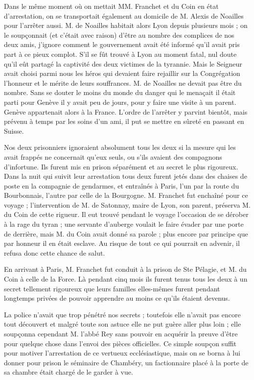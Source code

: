 Dans le même moment où on mettait MM. Franchet et du Coin en état d'arrestation, on se transportait également au domicile de M. Alexis de Noailles pour l'arrêter aussi. M. de Noailles habitait alors Lyon depuis plusieurs mois ; on le soupçonnait (et c'était avec raison) d'être au nombre des complices de nos deux amis, j'ignore comment le gouvernement avait été informé qu'il avait pris part à ce pieux complot. S'il se fût trouvé à Lyon au moment fatal, nul doute qu'il eût partagé la captivité des deux victimes de la tyrannie. Mais le Seigneur avait choisi parmi nous les héros qui devaient faire rejaillir sur la Congrégation l'honneur et le mérite de leurs souffrances. M. de Noailles ne devait pas être du nombre. Sans se douter le moins du monde du danger qui le menaçait il était parti pour Genève il y avait peu de jours, pour y faire une visite à un parent. Genève appartenait alors à la France. L'ordre de l'arrêter y parvint bientôt, mais prévenu à temps
par les soins d'un ami, il put se mettre en sûreté en passant en Suisse.

Nos deux prisonniers ignoraient absolument tous les deux si la mesure qui les avait frappés ne concernait qu'eux seuls, ou s'ils avaient des compagnons d'infortune. Ils furent mis en prison séparément et au secret le plus rigoureux. Dans la nuit qui suivit leur arrestation tous deux furent jetés dans des chaises de poste en la compagnie de gendarmes, et entraînés à Paris, l'un par la route du Bourbonnais, l'autre par celle de la Bourgogne. M. Franchet fut enchaîné pour ce voyage ; l'intervention de M. de Satonnay, maire de Lyon, son parent, préserva M. du Coin de cette rigueur. Il eut trouvé pendant le voyage l'occasion de se dérober à la rage du tyran ; une servante d'auberge voulait le faire évader par une porte de derrière, mais M. du Coin avait donné sa parole ; plus encore par principe que par honneur il en était esclave. Au risque de tout ce qui pourrait en advenir, il refusa donc cette chance de salut.

En arrivant à Paris, M. Franchet fut conduit à la prison de Ste Pélagie, et M. du Coin à celle de la Force. Là pendant cinq mois ils furent tenus tous les deux à un secret tellement rigoureux que leurs familles elles-mêmes furent pendant longtemps privées de pouvoir apprendre au moins ce qu'ils étaient devenus.

La police n'avait que trop pénétré nos secrets ; toutefois elle n'avait pas encore tout découvert et malgré toute son astuce elle ne put guère aller plus loin ; elle soupçonna cependant M. l'abbé Rey sans pouvoir en acquérir la preuve d'être pour quelque chose dans l'envoi des pièces officielles. Ce simple soupçon suffit pour motiver l'arrestation de ce vertueux ecclésiastique, mais on se borna à lui donner pour prison le séminaire de Chambéry,
un factionnaire placé à la porte de sa chambre était chargé de le garder à vue.

